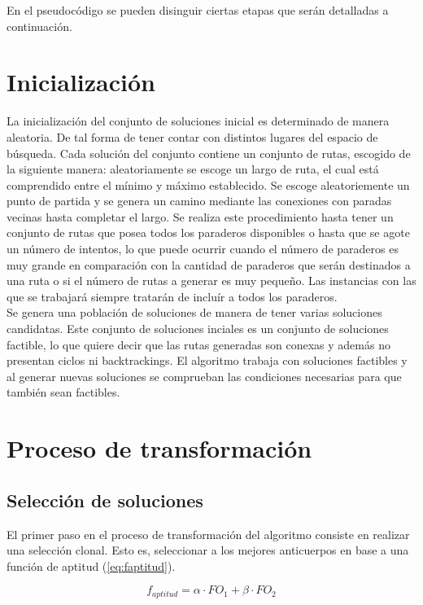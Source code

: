 \documentclass{llncs}
\begin{document}
En el pseudocódigo se pueden disinguir ciertas etapas que serán detalladas a continuación.

\section{Inicialización}

La inicialización del conjunto de soluciones inicial es determinado de manera aleatoria. De tal forma de tener contar con distintos lugares del espacio de búsqueda. Cada solución del conjunto contiene un conjunto de rutas, escogido de la siguiente manera: aleatoriamente se escoge un largo de ruta, el cual está comprendido entre el mínimo y máximo establecido. Se escoge aleatoriemente un punto de partida y se genera un camino mediante las conexiones con paradas vecinas hasta completar el largo. Se realiza este procedimiento hasta tener un conjunto de rutas que posea todos los paraderos disponibles o hasta que se agote un número de intentos, lo que puede ocurrir cuando el número de paraderos es muy grande en comparación con la cantidad de paraderos que serán destinados a una ruta o si el número de rutas a generar es muy pequeño. Las instancias con las que se trabajará siempre tratarán de incluír a todos los paraderos.\\

Se genera una población de soluciones de manera de tener varias soluciones candidatas. Este conjunto de soluciones inciales es un conjunto de soluciones factible, lo que quiere decir que las rutas generadas son conexas y además no presentan ciclos ni backtrackings. El algoritmo trabaja con soluciones factibles y al generar nuevas soluciones se comprueban las condiciones necesarias para que también sean factibles. 

\section{Proceso de transformación}

\subsection{Selección de soluciones}

El primer paso en el proceso de transformación del algoritmo consiste en realizar una selección clonal. Esto es, seleccionar a los mejores anticuerpos en base a una función de aptitud (\ref{eq:faptitud}). 

\begin{equation}
\label{eq:faptitud}
f_{aptitud}=\alpha \cdot FO_1 + \beta \cdot FO_2
\end{equation}
\end{document}
